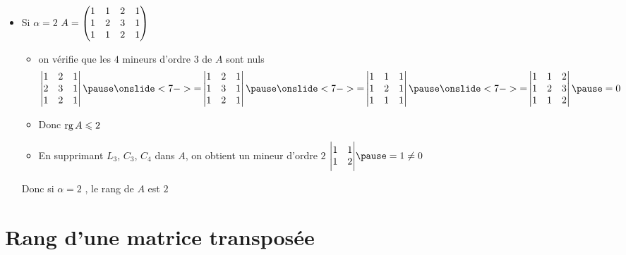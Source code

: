 \begin{frame}  
\begin{exemple}  
\begin{itemize}
  \item Si $\alpha =2$ \qquad $A= \begin{pmatrix}
1 & 1& 2&1\cr
1&2&3&1\cr
1&1&2 & 1 \cr
\end{pmatrix}$%
\begin{itemize}
  \item\pause on vérifie que les $4$ mineurs d'ordre $3$ de $A$ sont nuls
  \pause
  \[
  \begin{vmatrix} 1& 2&1 \\ 2&3&1 \\ 1& 2 & 1 \end{vmatrix} \pause
  \onslide<7->{=} \begin{vmatrix} 1 & 2&1 \\ 1&3&1 \\ 1& 2 & 1 \end{vmatrix} \pause
  \onslide<7->{=} \begin{vmatrix} 1 & 1& 1 \\ 1&2&1 \\ 1&1& 1 \end{vmatrix} \pause
  \onslide<7->{=} \begin{vmatrix} 1 & 1& 2 \\ 1&2&3 \\ 1&1& 2 \end{vmatrix} \pause
  = 0
  \] 
  \item\pause Donc  $\mathop{\text{rg}}\nolimits A \leqslant 2$
  \item\pause En supprimant $L_3$, $C_3$, $C_4$ dans $A$, \pause on obtient  un mineur d'ordre $2$
$\Bigg| \begin{matrix}
1 & 1 \cr
1 & 2 \cr
\end{matrix} \Bigg| \pause= 1 \neq 0$
\end{itemize}

\pause
Donc si $\alpha = 2$ , le rang de $A$ est $2$
\end{itemize}
\end{exemple}
\end{frame}



\section{Rang d'une matrice transposée}

